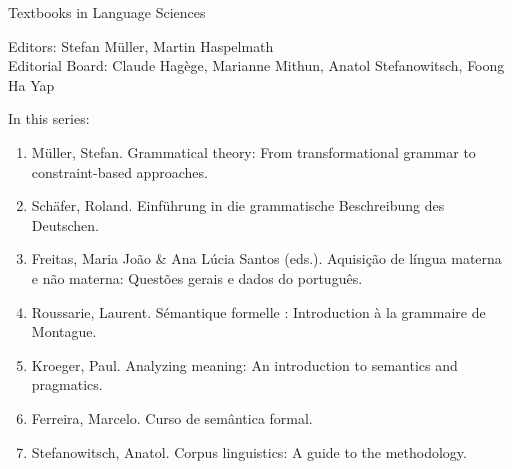 {\large Textbooks in Language Sciences}

\bigskip

Editors: Stefan Müller, Martin Haspelmath\\
Editorial Board: Claude Hagège, Marianne Mithun, Anatol Stefanowitsch, Foong Ha Yap

\bigskip

In this series:

\begin{enumerate}
\item Müller, Stefan. Grammatical theory: From transformational grammar to constraint-based approaches.
\item Schäfer, Roland. Einführung in die grammatische Beschreibung des Deutschen.
\item Freitas, Maria João \& Ana Lúcia Santos (eds.). Aquisição de língua materna e não materna: Questões gerais e dados do português.
\item Roussarie, Laurent. Sémantique formelle : Introduction à la grammaire de Montague.
\item Kroeger, Paul. Analyzing meaning: An introduction to semantics and pragmatics.
\item Ferreira, Marcelo. Curso de semântica formal.
\item Stefanowitsch, Anatol. Corpus linguistics: A guide to the methodology.
\end{enumerate}
